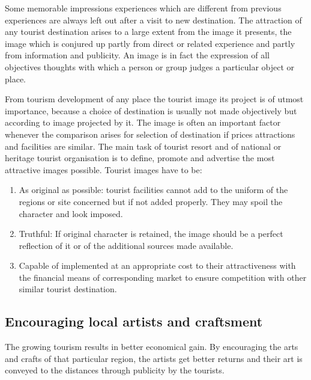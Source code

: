 Some memorable impressions experiences which are different from previous experiences are always left out after a visit to new destination. The attraction of any tourist destination arises to a large extent from the image it presents, the image which is conjured up partly from direct or related experience and partly from information and publicity. An image is in fact the expression of all objectives thoughts with which a person or group judges a particular object or place.

From tourism development of any place the tourist image its project is of utmost importance, because a choice of destination is usually not made objectively but according to image projected by it. The image is often an important factor whenever the comparison arises for selection of destination if prices attractions and facilities are similar. The main task of tourist resort and of national or heritage tourist organisation is to define, promote and advertise the most attractive images possible. Tourist images have to be:

\begin{enumerate}
  \item As original as possible: tourist facilities cannot add to the uniform of the regions or site concerned but if not added properly. They may spoil the character and look imposed.
  \item Truthful: If original character is retained, the image should be a perfect reflection of it or of the additional sources made available.
  \item Capable of implemented at an appropriate cost to their attractiveness with the financial means of corresponding market to ensure competition with other similar tourist destination.
\end{enumerate} 


\subsection{Encouraging local artists and craftsment} %
\label{sub:encor}

The growing tourism results in better economical gain. By encouraging the arts and crafts of that particular region, the artists get better returns and their art is conveyed to the distances through publicity by the tourists.



